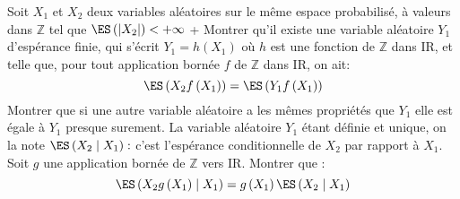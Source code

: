 \begin{exercise}[title=Polytechnique 2015]
Soit $X_{1}$ et $X_{2}$ deux variables aléatoires sur le même espace probabilisé, à valeurs dans $\mathbb{Z}$ tel que $\ES\left(\left|X_{2}\right|\right)<+\infty$
\question+ Montrer qu'il existe une variable aléatoire $Y_{1}$ d'espérance finie, qui s'écrit $Y_{1}=h\left(X_{1}\right)$ où $h$ est une fonction de $\mathbb{Z}$ dans IR, et telle que, pour tout application bornée $f$ de $\mathbb{Z}$ dans IR, on ait:
\begin{equation*}
\ES\left(X_{2} f\left(X_{1}\right)\right)=\ES\left(Y_{1} f\left(X_{1}\right)\right)
\end{equation*}
\question Montrer que si une autre variable aléatoire a les mêmes propriétés que $Y_{1}$ elle est égale à $Y_{1}$ presque surement.
\question La variable aléatoire $Y_{1}$ étant définie et unique, on la note $\ES\left(X_{2} \mid X_{1}\right):$ c'est l'espérance conditionnelle de $X_{2}$ par rapport à $X_{1} $. Soit $g$ une application bornée de $\mathbb{Z}$ vers IR. Montrer que :
\begin{equation*}
\ES\left(X_{2} g\left(X_{1}\right) \mid X_{1}\right)=g\left(X_{1}\right) \ES\left(X_{2} \mid X_{1}\right)
\end{equation*}
\endquestions 
\end{exercise}